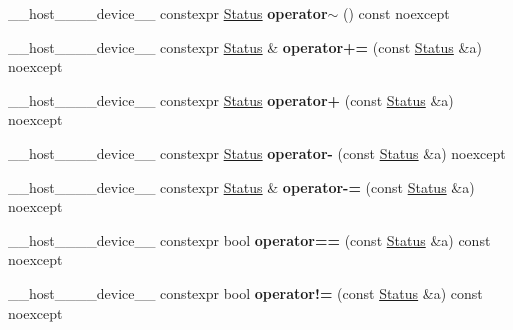 \begin{DoxyCompactItemize}
\+\_\+\+\_\+host\+\_\+\+\_\+\+\_\+\+\_\+device\+\_\+\+\_\+ constexpr \hyperlink{classwarpcore_1_1Status}{Status} {\bfseries operator$\sim$} () const noexcept
\item 
\mbox{\label{classwarpcore_1_1Status_aeacd648463b5ac7ae3019fc808eb8160}} 
\+\_\+\+\_\+host\+\_\+\+\_\+\+\_\+\+\_\+device\+\_\+\+\_\+ constexpr \hyperlink{classwarpcore_1_1Status}{Status} \& {\bfseries operator+=} (const \hyperlink{classwarpcore_1_1Status}{Status} \&a) noexcept
\item 
\mbox{\label{classwarpcore_1_1Status_a00d9d20cdcc7c1299e00365eece0158d}} 
\+\_\+\+\_\+host\+\_\+\+\_\+\+\_\+\+\_\+device\+\_\+\+\_\+ constexpr \hyperlink{classwarpcore_1_1Status}{Status} {\bfseries operator+} (const \hyperlink{classwarpcore_1_1Status}{Status} \&a) noexcept
\item 
\mbox{\label{classwarpcore_1_1Status_a8c67e3cd67fcd7255de055b969dae293}} 
\+\_\+\+\_\+host\+\_\+\+\_\+\+\_\+\+\_\+device\+\_\+\+\_\+ constexpr \hyperlink{classwarpcore_1_1Status}{Status} {\bfseries operator-\/} (const \hyperlink{classwarpcore_1_1Status}{Status} \&a) noexcept
\item 
\mbox{\label{classwarpcore_1_1Status_a22aa3d5cab1154c71b241204b9f0711b}} 
\+\_\+\+\_\+host\+\_\+\+\_\+\+\_\+\+\_\+device\+\_\+\+\_\+ constexpr \hyperlink{classwarpcore_1_1Status}{Status} \& {\bfseries operator-\/=} (const \hyperlink{classwarpcore_1_1Status}{Status} \&a) noexcept
\item 
\mbox{\label{classwarpcore_1_1Status_a81cc6518597e1bcf3a15264a4d643aaa}} 
\+\_\+\+\_\+host\+\_\+\+\_\+\+\_\+\+\_\+device\+\_\+\+\_\+ constexpr bool {\bfseries operator==} (const \hyperlink{classwarpcore_1_1Status}{Status} \&a) const noexcept
\item 
\mbox{\label{classwarpcore_1_1Status_a01d6e2228b4081ec567e21729d8d1eb5}} 
\+\_\+\+\_\+host\+\_\+\+\_\+\+\_\+\+\_\+device\+\_\+\+\_\+ constexpr bool {\bfseries operator!=} (const \hyperlink{classwarpcore_1_1Status}{Status} \&a) const noexcept
\item 
\mbox{\label{classwarpcore_1_1Status_ae9b0969040d2aa921e5fb0d9f7eefa79}} 

\end{DoxyCompactItemize}

